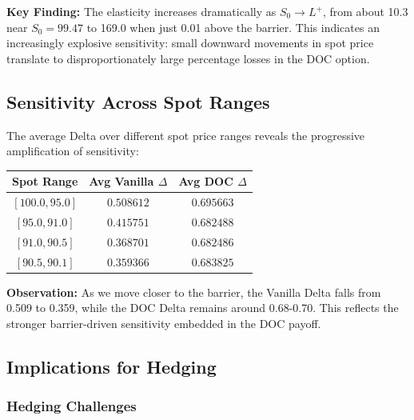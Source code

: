 \documentclass{report}
\begin{document}
\textbf{Key Finding:} The elasticity increases dramatically as $S_0 \to L^+$, from about 10.3 near $S_0=99.47$ to 169.0 when just 0.01 above the barrier. This indicates an increasingly explosive sensitivity: small downward movements in spot price translate to disproportionately large percentage losses in the DOC option.

\subsection{Sensitivity Across Spot Ranges}

The average Delta over different spot price ranges reveals the progressive amplification of sensitivity:

\begin{center}
\begin{tabular}{ccc}
\toprule
Spot Range & Avg Vanilla $\Delta$ & Avg DOC $\Delta$ \\
\midrule
$[100.0, 95.0]$ & $0.508612$ & $0.695663$ \\
$[95.0, 91.0]$ & $0.415751$ & $0.682488$ \\
$[91.0, 90.5]$ & $0.368701$ & $0.682486$ \\
$[90.5, 90.1]$ & $0.359366$ & $0.683825$ \\
\bottomrule
\end{tabular}
\end{center}

\textbf{Observation:} As we move closer to the barrier, the Vanilla Delta falls from 0.509 to 0.359, while the DOC Delta remains around 0.68-0.70. This reflects the stronger barrier-driven sensitivity embedded in the DOC payoff.

\subsection{Implications for Hedging}

\subsubsection{Hedging Challenges}
\end{document}
